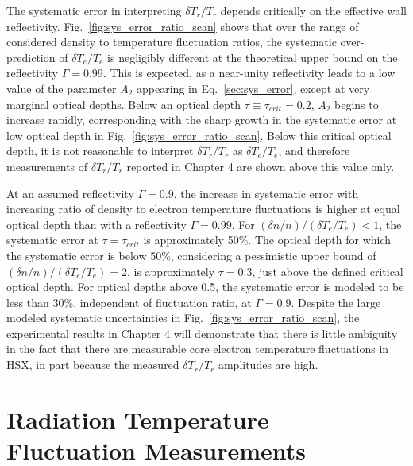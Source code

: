 \documentclass[%
 aip,
 amsmath,amssymb,
 reprint,%
]{revtex4-1}
\begin{document}
The systematic error in interpreting $\delta T_r/T_r$ depends critically on the effective wall reflectivity. Fig.\ \ref{fig:sys_error_ratio_scan} shows that over the range of considered density to temperature fluctuation ratios, the systematic over-prediction of $\delta T_e/T_e$ is negligibly different at the theoretical upper bound on the reflectivity $\Gamma=0.99$. This is expected, as a near-unity reflectivity leads to a low value of the parameter $A_2$ appearing in Eq.\ \eqref{sec:sys_error}, except at very marginal optical depths. Below an optical depth $\tau\equiv\tau_{crit}=0.2$, $A_2$ begins to increase rapidly, corresponding with the sharp growth in the systematic error at low optical depth in Fig.\ \ref{fig:sys_error_ratio_scan}. Below this critical optical depth, it is not reasonable to interpret $\delta T_r/T_r$ as $\delta T_e/T_e$, and therefore measurements of $\delta T_r/T_r$ reported in Chapter 4 are shown above this value only.

At an assumed reflectivity $\Gamma=0.9$, the increase in systematic error with increasing ratio of density to electron temperature fluctuations is higher at equal optical depth than with a reflectivity $\Gamma=0.99$. For $(\delta n/n)/(\delta T_e/T_e) < 1$, the systematic error at $\tau=\tau_{crit}$ is approximately 50\%. The optical depth for which the systematic error is below 50\%, considering a pessimistic upper bound of $(\delta n/n)/(\delta T_e/T_e)=2$, is approximately $\tau=0.3$, just above the defined critical optical depth. For optical depths above 0.5, the systematic error is modeled to be less than 30\%, independent of fluctuation ratio, at $\Gamma=0.9$. Despite the large modeled systematic uncertainties in Fig.\ \ref{fig:sys_error_ratio_scan}, the experimental results in Chapter 4 will demonstrate that there is little ambiguity in the fact that there are measurable core electron temperature fluctuations in HSX, in part because the measured $\delta T_r/T_r$ amplitudes are high.



\section{\label{sec:exp_cece} Radiation Temperature Fluctuation Measurements} 
\end{document}
